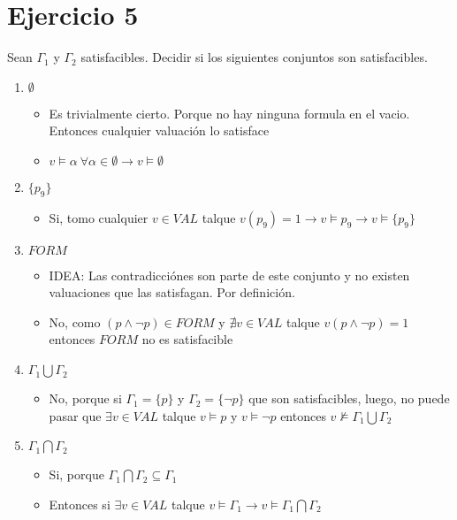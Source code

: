\documentclass[14pt,a4paper,fleqn]{article}
\newcommand{\entonces}{\rightarrow}
\newcommand{\satisface}{\vDash}
\newcommand{\nosatisf}{\nvDash}
\begin{document}
\section*{Ejercicio 5}
Sean $\Gamma_{1}$ y $\Gamma_{2}$ satisfacibles. Decidir si los siguientes conjuntos son satisfacibles.
\begin{enumerate}
	\item $\emptyset$
	\begin{itemize}
		\item Es trivialmente cierto. Porque no hay ninguna formula en el vacio. Entonces cualquier valuación lo satisface
		\item $v \satisface \alpha \: \forall \alpha \in \emptyset \entonces v \satisface \emptyset $
	\end{itemize}
	\item $\{p_{9}\}$
	\begin{itemize}
		\item Si, tomo cualquier $v \in VAL$ talque $v(p_{9})=1 \entonces v \satisface p_{9} \entonces v \satisface \{p_{9}\}$
	\end{itemize}
	\item $FORM$
	\begin{itemize}
		\item IDEA: Las contradicciónes son parte de este conjunto y no existen valuaciones que las satisfagan. Por definición.
		\item No, como $(p \wedge \neg p) \in FORM$ y $\nexists v \in VAL $ talque $v(p \wedge \neg p) = 1$ entonces $FORM$ no es satisfacible
	\end{itemize}
	\item $\Gamma_{1} \bigcup \Gamma_{2}$
	\begin{itemize}
		\item No, porque si $\Gamma_{1} = \{p\}$ y $\Gamma_{2} = \{\neg p \}$ que son satisfacibles, luego, no puede pasar que $\exists v \in VAL$ talque $v \satisface p$ y $v \satisface \neg p$ entonces $v \nosatisf \Gamma_{1} \bigcup \Gamma_{2}$
	\end{itemize}
	\item $\Gamma_{1} \bigcap \Gamma_{2}$
	\begin{itemize}
		\item Si, porque $\Gamma_{1} \bigcap \Gamma_{2} \subseteq \Gamma_{1}$
		\item Entonces si $\exists v \in VAL$ talque $v \satisface \Gamma_{1} \entonces v \satisface \Gamma_{1} \bigcap \Gamma_{2}$
	\end{itemize}
\end{enumerate}
\end{document}
